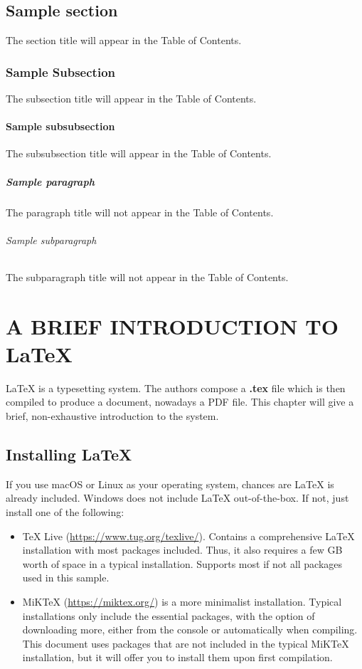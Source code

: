 \documentclass[en,inscr,ack,preface]{dimscthesis}
\begin{document}
\section{Sample section}

The section title will appear in the Table of Contents.

\subsection{Sample Subsection}

The subsection title will appear in the Table of Contents.

\subsubsection{Sample subsubsection}

The subsubsection title will appear in the Table of Contents.

\paragraph{Sample paragraph}

The paragraph title will not appear in the Table of Contents.

\subparagraph{Sample subparagraph}

The subparagraph title will not appear in the Table of Contents.

\chapter{A BRIEF INTRODUCTION TO \LaTeX} \label{introduction_to_latex}

\LaTeX{} is a typesetting system.
The authors compose a \textbf{.tex} file which is then compiled to produce a document, nowadays a PDF file.
This chapter will give a brief, non-exhaustive introduction to the system.

\section{Installing \LaTeX} \label{installing_latex}

If you use macOS or Linux as your operating system, chances are \LaTeX{} is already included.
Windows does not include \LaTeX{} out-of-the-box.
If not, just install one of the following:
\begin{itemize}
    \item TeX Live (\url{https://www.tug.org/texlive/}).
    Contains a comprehensive \LaTeX{} installation with most packages included.
    Thus, it also requires a few GB worth of space in a typical installation.
    Supports most if not all packages used in this sample.
    \item MiKTeX (\url{https://miktex.org/}) is a more minimalist installation.
    Typical installations only include the essential packages, with the option of downloading more, either from the console or automatically when compiling.
    This document uses packages that are not included in the typical MiKTeX installation, but it will offer you to install them upon first compilation.
\end{itemize}
\end{document}
